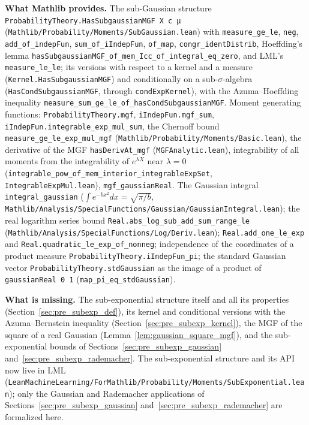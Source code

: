 \textbf{What Mathlib provides.} The sub-Gaussian structure
\texttt{ProbabilityTheory.HasSubgaussianMGF X c μ} (\texttt{Mathlib/Probability/Moments/SubGaussian.lean})
with \texttt{measure\_ge\_le}, \texttt{neg}, \texttt{add\_of\_indepFun},
\texttt{sum\_of\_iIndepFun}, \texttt{of\_map}, \texttt{congr\_identDistrib}, Hoeffding's lemma
\texttt{hasSubgaussianMGF\_of\_mem\_Icc\_of\_integral\_eq\_zero}, and LML's
\texttt{measure\_le\_le}; its versions with respect to a kernel and a measure
(\texttt{Kernel.HasSubgaussianMGF}) and conditionally on a sub-$\sigma$-algebra
(\texttt{HasCondSubgaussianMGF}, through \texttt{condExpKernel}), with the Azuma--Hoeffding
inequality \texttt{measure\_sum\_ge\_le\_of\_hasCondSubgaussianMGF}. Moment generating functions: \texttt{ProbabilityTheory.mgf},
\texttt{iIndepFun.mgf\_sum}, \texttt{iIndepFun.integrable\_exp\_mul\_sum}, the Chernoff bound
\texttt{measure\_ge\_le\_exp\_mul\_mgf} (\texttt{Mathlib/Probability/Moments/Basic.lean}),
the derivative of the MGF \texttt{hasDerivAt\_mgf} (\texttt{MGFAnalytic.lean}), integrability
of all moments from the integrability of $e^{\lambda X}$ near $\lambda = 0$
(\texttt{integrable\_pow\_of\_mem\_interior\_integrableExpSet}, \texttt{IntegrableExpMul.lean}),
\texttt{mgf\_gaussianReal}. The Gaussian integral \texttt{integral\_gaussian}
($\int e^{-bx^2}dx = \sqrt{\pi/b}$,
\texttt{Mathlib/Analysis/SpecialFunctions/Gaussian/GaussianIntegral.lean}); the real logarithm
series bound \texttt{Real.abs\_log\_sub\_add\_sum\_range\_le}
(\texttt{Mathlib/Analysis/SpecialFunctions/Log/Deriv.lean}); \texttt{Real.add\_one\_le\_exp} and
\texttt{Real.quadratic\_le\_exp\_of\_nonneg}; independence of the coordinates of a product
measure \texttt{ProbabilityTheory.iIndepFun\_pi}; the standard Gaussian vector
\texttt{ProbabilityTheory.stdGaussian} as the image of a product of \texttt{gaussianReal 0 1}
(\texttt{map\_pi\_eq\_stdGaussian}).

\textbf{What is missing.} The sub-exponential structure itself and all its properties
(Section~\ref{sec:pre_subexp_def}), its kernel and conditional versions with the
Azuma--Bernstein inequality (Section~\ref{sec:pre_subexp_kernel}), the MGF of the square of a
real Gaussian (Lemma~\ref{lem:gaussian_square_mgf}), and the sub-exponential bounds of
Sections~\ref{sec:pre_subexp_gaussian} and~\ref{sec:pre_subexp_rademacher}. The sub-exponential
structure and its API now live in LML
(\texttt{LeanMachineLearning/ForMathlib/Probability/Moments/SubExponential.lean}); only the
Gaussian and Rademacher applications of Sections~\ref{sec:pre_subexp_gaussian}
and~\ref{sec:pre_subexp_rademacher} are formalized here.

